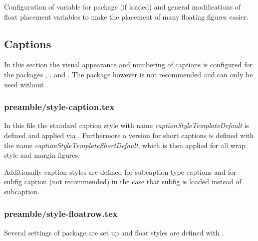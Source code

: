 Configuration of variable for package  (if loaded) and 
general modifications of float placement variables to make the placement of 
many floating figures easier.


\subsection{Captions}

In this section the visual appearance and numbering of captions is configured 
for the packages , , 
 and . 
The package  however is not 
recommended and can only be used without .


\subsubsection{preamble/style-caption.tex}

In this file the standard caption style with name \emph{captionStyleTemplateDefault} is defined and applied via . Furthermore a version for short captions is defined with the name \emph{captionStyleTemplateShortDefault}, which is then applied for all wrap style and margin figures.

Additionally caption styles are defined for subcaption type captions and for subfig caption (not recommended) in the case that subfig is loaded instead of subcaption.


\subsubsection{preamble/style-floatrow.tex}

Several settings of package  are set up and float styles are defined with .



